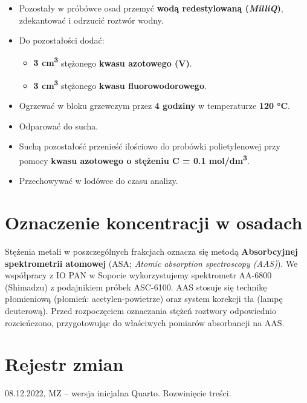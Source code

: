 \documentclass[
  letterpaper,
  DIV=11,
  numbers=noendperiod]{scrreprt}
\begin{document}
\begin{itemize}
\item
  Pozostały w próbówce osad przemyć \textbf{wodą redestylowaną
  (\emph{MilliQ})}, zdekantować i odrzucić roztwór wodny.
\item
  Do pozostałości dodać:

  \begin{itemize}
  \item
    \textbf{3 cm\textsuperscript{3}} stężonego \textbf{kwasu azotowego
    (V)}.
  \item
    \textbf{3 cm\textsuperscript{3}} stężonego \textbf{kwasu
    fluorowodorowego}.
  \end{itemize}
\item
  Ogrzewać w bloku grzewczym przez \textbf{4 godziny} w temperaturze
  \textbf{120 °C}.
\item
  Odparować do sucha.
\item
  Suchą pozostałość przenieść ilościowo do probówki polietylenowej przy
  pomocy \textbf{kwasu azotowego o stężeniu C = 0.1
  mol/dm\textsuperscript{3}}.
\item
  Przechowywać w lodówce do czasu analizy.
\end{itemize}

\hypertarget{oznaczenie-koncentracji-w-osadach}{%
\section{Oznaczenie koncentracji w
osadach}\label{oznaczenie-koncentracji-w-osadach}}

Stężenia metali w poszczególnych frakcjach oznacza się metodą
\textbf{Absorbcyjnej spektrometrii atomowej} (ASA; \emph{Atomic
absorption spectroscopy (AAS)}). We współpracy z IO PAN w Sopocie
wykorzystujemy spektrometr AA-6800 (Shimadzu) z podajnikiem próbek
ASC-6100. AAS stosuje się technikę płomieniową (płomień:
acetylen-powietrze) oraz system korekcji tła (lampę deuterową). Przed
rozpoczęciem oznaczania stężeń roztwory odpowiednio rozcieńczono,
przygotowując do właściwych pomiarów absorbancji na AAS.

\hypertarget{pagebreak-rejestr-zmian-7}{%
\section{\texorpdfstring{\newpage{}Rejestr
zmian}{Rejestr zmian}}\label{pagebreak-rejestr-zmian-7}}

08.12.2022, MZ -- wersja inicjalna Quarto. Rozwinięcie treści.
\end{document}
